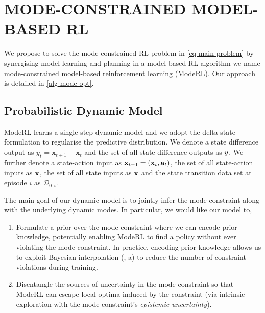 \documentclass[twoside]{article}
\newcommand{\numData}{\ensuremath{t}}
\newcommand{\singleData}[1]{\ensuremath{#1_{\numData}}}
\newcommand{\allData}[1]{\ensuremath{\MakeUppercase{#1}}}
\newcommand{\state}{\ensuremath{\mathbf{x}}}
\newcommand{\x}{\ensuremath{\mathbf{x}}}
\newcommand{\y}{\ensuremath{y}}
\newcommand{\dataset}{\ensuremath{\mathcal{D}}}
\newcommand{\singleInput}{\ensuremath{\x_{\numData-1}}}
\newcommand{\singleOutput}{\ensuremath{\singleData{\y}}}
\newcommand{\allInput}{\ensuremath{\allData{\x}}}
\newcommand{\allOutput}{\ensuremath{\MakeUppercase{\y}}}
\newcommand{\allState}{\ensuremath{\allData{\state}}}
\begin{document}
\section{MODE-CONSTRAINED MODEL-BASED RL \label{sec-mode-optimisation}}
\label{sec:org788d667}
We propose to solve the mode-constrained RL problem in \cref{eq-main-problem} by synergising model learning and planning in a
model-based RL algorithm we name mode-constrained model-based reinforcement learning (ModeRL).
Our approach is detailed in \cref{alg-mode-opt}.
\subsection{Probabilistic Dynamic Model}
\label{sec:org36bd6dc}

ModeRL learns a single-step dynamic model and we adopt the delta state formulation to regularise the predictive distribution.
We denote a state difference output as \(\singleOutput = \state_{t+1} - \state_{t}\) and the set of all state difference outputs as  \(\allOutput\).
We further denote a state-action input as \(\singleInput = (\state_{\timeInd}, \action_{\timeInd})\), the set of all state-action inputs
as \(\allInput\), the set of all state inputs as \(\allState\) and the state transition data set at episode \(i\) as \(\dataset_{0:i}\).

The main goal of our dynamic model is to jointly infer the mode constraint along with the underlying dynamic modes.
In particular, we would like our model to,
\begin{enumerate}
\item Formulate a prior over the mode constraint where we can encode prior knowledge, potentially enabling ModeRL to find a policy without ever violating the mode constraint.
In practice, encoding prior knowledge allows us to exploit Bayesian interpolation (, a) to reduce the number of constraint violations during training.
\item Disentangle the sources of uncertainty in the mode constraint so that ModeRL can escape local optima induced by the constraint (via intrinsic exploration with the mode constraint's \emph{epistemic uncertainty}).
\end{enumerate}
\end{document}
